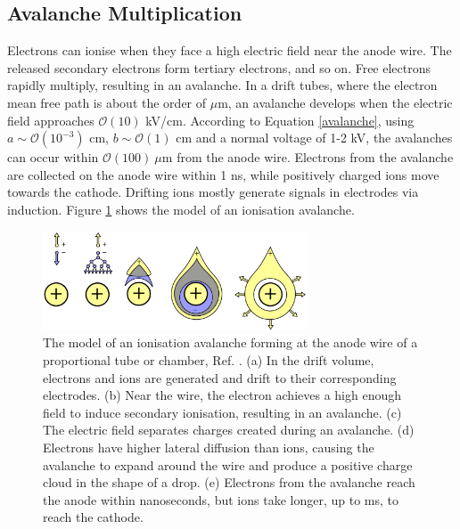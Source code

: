 \subsection{Avalanche Multiplication}
Electrons can ionise when they face a high electric field near the anode wire. 
The released secondary electrons form tertiary electrons, and so on. Free electrons rapidly multiply, 
resulting in an avalanche. In a drift tubes, where the electron mean free path is about the order of $\mu$m, 
an avalanche develops when the electric field approaches $\mathcal{O}(10)$ kV/cm. 
According to Equation \ref{avalanche}, using $a \sim \mathcal{O}(10^{-3})$ cm, $b \sim \mathcal{O}(1)$ cm and
a normal voltage of 1-2 kV, the avalanches can occur within $\mathcal{O}(100) \ \mu$m from the anode wire. 
Electrons from the avalanche are collected on the anode wire within 1 ns, while positively charged ions move towards the cathode.
Drifting ions mostly generate signals in electrodes via induction. Figure \ref{fig:avalanche} shows the model of an ionisation avalanche.
\begin{figure}[!h]
    \centering
    \includegraphics[width =0.7\textwidth]{figures/png/Screenshot_20240330_182509.png}
    \caption[The model of an ionisation avalanche forming at the anode wire of a proportional tube.]{The model of an ionisation avalanche forming at the anode wire of a proportional tube or chamber, Ref. \cite{kola}. 
    (a) In the drift volume, electrons and ions are generated and drift to their corresponding electrodes. 
    (b) Near the wire, the electron achieves a high enough field to induce secondary ionisation, resulting in an avalanche. 
    (c) The electric field separates charges created during an avalanche. 
    (d) Electrons have higher lateral diffusion than ions, causing the avalanche to expand 
    around the wire and produce a positive charge cloud in the shape of a drop. 
    (e) Electrons from the avalanche reach the anode within nanoseconds, but ions take longer, up to ms, to reach the cathode.}
    \label{fig:avalanche}
\end{figure}
